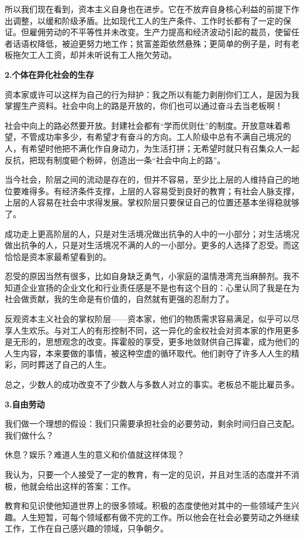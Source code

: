 \par 所以我们现在看到，资本主义自身也在进步。它在不放弃自身核心利益的前提下作出调整，以缓和阶级矛盾。比如现代工人的生产条件、工作时长都有了一定的保证。但雇佣劳动的不平等性并未改变。生产力提高和经济波动引起的裁员，使留任者话语权降低，被迫更努力地工作；贫富差距依然悬殊；更简单的例子是，时有老板拖欠工人工资，却并未听说有工人拖欠劳动。
\par \textbf{2.个体在异化社会的生存}
\par 资本家或许可以这样为自己的行为辩护：我之所以有能力剥削你们工人，是因为我掌握生产资料。社会中向上的路是开放的，你们也可以通过奋斗去当老板啊！
\par 社会中向上的路必然要开放。封建社会都有“学而优则仕”的制度。开放意味着希望，不管成功率多少，有希望才有奋斗的方向。工人阶级中总有不满自己境况的人，有希望时他把不满化作自身动力，为生活打拼；无希望时就只有召集众人一起反抗，把现有制度砸个粉碎，创造出一条“社会中向上的路”。
\par 当今社会，阶层之间的流动是存在的，但并不容易，至少比上层的人维持自己的地位要难得多。有经济条件支撑，上层的人容易受到良好的教育；有社会人脉支撑，上层的人容易在社会中求得发展。掌权阶层只要保证自己的位置还基本坐得稳就够了。
\par 成功走上更高阶层的人，只是对生活境况做出抗争的人中的一小部分；对生活境况做出抗争的人，只是对生活境况不满的人的一小部分。更多的人选择了忍受。而这恰恰是资本家最希望看到的。
\par 忍受的原因当然有很多，比如自身缺乏勇气，小家庭的温情港湾充当麻醉剂。我不知道企业宣扬的企业文化和行业责任感是不是也有这个目的：心里认同了我是在为社会做贡献，我的生命是有价值的，自然就有更强的忍耐力了。
\par 反观资本主义社会的掌权阶层——资本家，他们的物质需求容易满足，似乎可以尽享人生欢乐。与对工人的有形控制不同，这一异化的金权社会对资本家的作用更多是无形的，思想观念的改变。挥霍般的享受，更多地敛财供自己挥霍，成为他们的人生内容，本来要做的事情，被这种空虚的循环取代。他们剥夺了许多人人生的精彩，同时葬送了自己的人生。
\par 总之，少数人的成功改变不了少数人与多数人对立的事实。老板总不能比雇员多。
\par \textbf{3.自由劳动}
\par 我们做一个理想的假设：我们只需要承担社会的必要劳动，剩余时间归自己支配。我们做什么？
\par 休息？娱乐？难道人生的意义和价值就这样体现？
\par 我认为，只要一个人接受了一定的教育，有一定的见识，并且对生活的态度并不消极，他就会给出这样的答案：工作。
\par 教育和见识使他知道世界上的很多领域。积极的态度使他对其中的一些领域产生兴趣。人生短暂，可每个领域都有做不完的工作。所以他会在社会必要劳动之外继续工作，工作在自己感兴趣的领域，只争朝夕。
